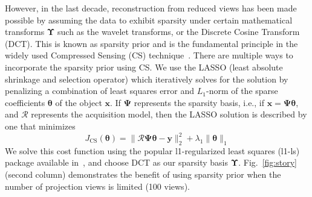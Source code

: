 \documentclass[journal]{IEEEtran}
\begin{document}
However, in the last decade, reconstruction from reduced views has
been made possible by assuming the data to exhibit sparsity under
certain mathematical transforms $\boldsymbol{\Upsilon}$ such as the
wavelet transforms, or the Discrete Cosine Transform (DCT). This is
known as sparsity prior and is the fundamental principle in the widely
used Compressed Sensing (CS) technique~\cite{Donoho,introCS}.  There
are multiple ways to incorporate the sparsity prior using CS. We use
the LASSO (least absolute shrinkage and selection operator) which
iteratively solves for the solution by penalizing a combination of
least squares error and $L_1$-norm of the sparse coefficients
$\boldsymbol{\theta}$ of the object $\boldsymbol{x}$. If $\boldsymbol{\Psi}$
represents the sparsity basis, i.e., if $\boldsymbol{x} = \boldsymbol{\Psi\theta}$, and 
$\boldsymbol{\mathcal{R}}$ represents the acquisition model, then the
LASSO solution is described by one that minimizes
 \begin{equation}
J_{\text{CS}}(\boldsymbol{\theta}) = \lVert\boldsymbol{\mathcal{R} \Psi\theta}- \boldsymbol{y}\rVert_2^2  + \lambda_1\lVert\boldsymbol{\theta}\rVert_1
\label{Eq:simple_cs}
 \end{equation}
 We solve this cost function using the popular l1-regularized least
 squares (l1-ls) package available in~\cite{l1ls}, and choose DCT as
 our sparsity basis $\boldsymbol{\Upsilon}$.  Fig.~\ref{fig:story}
 (second column) demonstrates the benefit of using sparsity prior when
 the number of projection views is limited (100 views).

\end{document}
